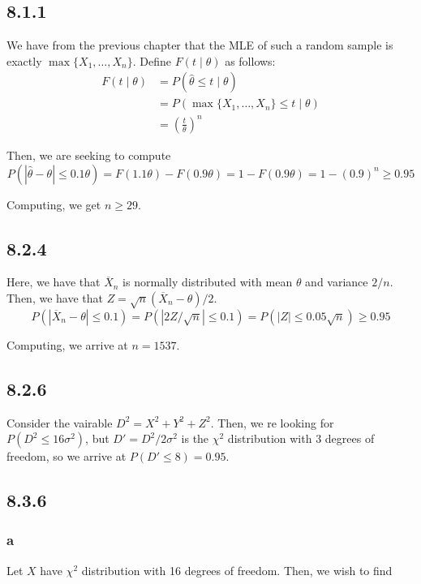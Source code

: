 \documentclass[12pt,letterpaper]{article}
\theoremstyle{definition}
\begin{document}
\subsection*{8.1.1}

We have from the previous chapter that the MLE of such a random sample is
exactly $\max\{X_1, \dots, X_n\}$. Define $F(t \mid \theta)$ as follows:
\begin{align*}
  F(t \mid \theta) &= P(\hat{\theta} \leq t \mid \theta) \\
                   &= P(\max\{X_1, \dots, X_n\} \leq t \mid \theta) \\
                   &= \left(\frac{t}{\theta}\right)^n
\end{align*}

Then, we are seeking to compute
\[
  P(|\hat{\theta} - \theta| \leq 0.1 \theta) = F(1.1\theta) - F(0.9\theta) = 1 -
  F(0.9\theta) = 1- (0.9)^n \geq 0.95
\]

Computing, we get $n \geq 29$.

\subsection*{8.2.4}

Here, we have that $\overline{X}_n$ is normally distributed with mean $\theta$
and variance $2/n$. Then, we have that $Z = \sqrt{n}(\overline{X}_n -
\theta)/2$.
\[
  P(|\overline{X}_n -\theta| \leq 0.1) = P(|2Z/\sqrt{n}| \leq 0.1) = P(|Z| \leq
0.05\sqrt{n}) \geq 0.95
\]

Computing, we arrive at $n = 1537$.

\subsection*{8.2.6}

Consider the vairable $D^2 = X^2 + Y^2 + Z^2$. Then, we re looking for $P(D^2
\leq 16\sigma^2)$, but $D' = D^2 / 2\sigma^2$ is the $\chi^2$ distribution with 3
degrees of freedom, so we arrive at $P(D' \leq 8) = 0.95$.

\subsection*{8.3.6}

\subsubsection*{a}

Let $X$ have $\chi^2$ distribution with 16 degrees of freedom. Then, we wish to find
\end{document}
